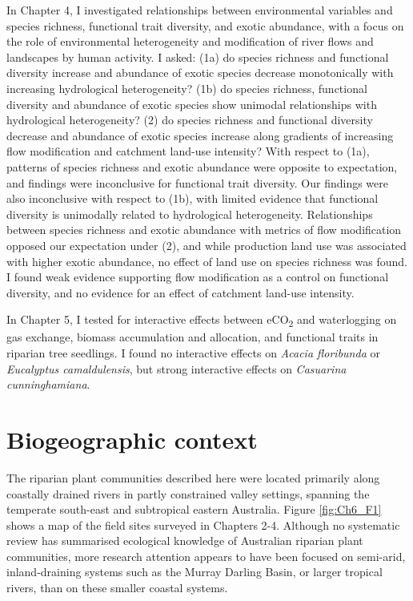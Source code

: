 \documentclass[openright,12pt,a4paper]{memoir}
\begin{document}
In Chapter 4, I investigated relationships between environmental variables and species richness, functional trait diversity, and exotic abundance, with a focus on the role of environmental heterogeneity and modification of river flows and landscapes by human activity. I asked: (1a) do species richness and functional diversity increase and abundance of exotic species decrease monotonically with increasing hydrological heterogeneity? (1b) do species richness, functional diversity and abundance of exotic species show unimodal relationships with hydrological heterogeneity? (2) do species richness and functional diversity decrease and abundance of exotic species increase along gradients of increasing flow modification and catchment land-use intensity? With respect to (1a), patterns of species richness and exotic abundance were opposite to expectation, and findings were inconclusive for functional trait diversity. Our findings were also inconclusive with respect to (1b), with limited evidence that functional diversity is unimodally related to hydrological heterogeneity. Relationships between species richness and exotic abundance with metrics of flow modification opposed our expectation under (2), and while production land use was associated with higher exotic abundance, no effect of land use on species richness was found. I found weak evidence supporting flow modification as a control on functional diversity, and no evidence for an effect of catchment land-use intensity.

In Chapter 5, I tested for interactive effects between eCO\textsubscript{2} and waterlogging on gas exchange, biomass accumulation and allocation, and functional traits in riparian tree seedlings. I found no interactive effects on \textit{Acacia floribunda} or \textit{Eucalyptus camaldulensis}, but strong interactive effects on \textit{Casuarina cunninghamiana}.

\section{Biogeographic context}
The riparian plant communities described here were located primarily along coastally drained rivers in partly constrained valley settings, spanning the temperate south-east and subtropical eastern Australia. Figure \ref{fig:Ch6_F1} shows a map of the field sites surveyed in Chapters 2-4. Although no systematic review has summarised ecological knowledge of Australian riparian plant communities, more research attention appears to have been focused on semi-arid, inland-draining systems such as the Murray Darling Basin, or larger tropical rivers, than on these smaller coastal systems.
\end{document}
